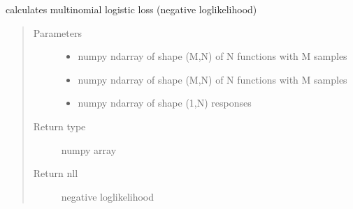 \documentclass[letterpaper,10pt,english]{sphinxmanual}
\begin{document}
\begin{fulllineitems}
\label{\detokenize{regression:regression.mlogit_loss}}
calculates multinomial logistic loss (negative log\sphinxhyphen{}likelihood)
\begin{quote}\begin{description}
\item[{Parameters}] \leavevmode\begin{itemize}
\item {} 
 \textendash{} numpy ndarray of shape (M,N) of N functions with M samples

\item {} 
 \textendash{} numpy ndarray of shape (M,N) of N functions with M samples

\item {} 
 \textendash{} numpy ndarray of shape (1,N) responses

\end{itemize}

\item[{Return type}] \leavevmode
numpy array

\item[{Return nll}] \leavevmode
negative log\sphinxhyphen{}likelihood

\end{description}\end{quote}

\end{fulllineitems}

\end{document}

